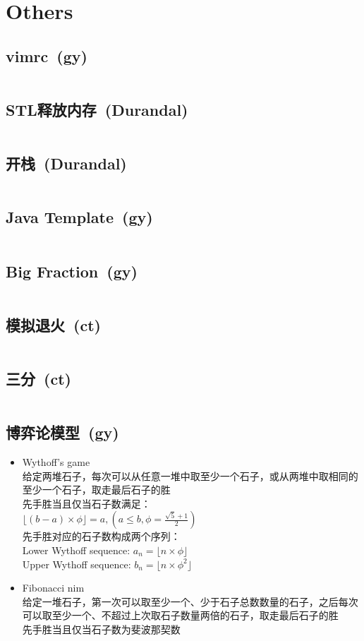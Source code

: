 \chapter{Others}
\section{vimrc\ \small(gy)}
	\inputminted{vim}{Others/.vimrc}
\section{STL释放内存\ \small(Durandal)}
	\inputminted{cpp}{Others/stl_clear.cpp}
\section{开栈\ \small(Durandal)}
	\inputminted{cpp}{Others/rsp.cpp}
\section{Java Template\ \small(gy)}
	\inputminted{java}{Others/Template.java}
\section{Big Fraction\ \small(gy)}
	\inputminted{kotlin}{Others/big_fraction.kt}
\section{模拟退火\ \small(ct)}
	\inputminted{cpp}{Others/simulated_annealing.cpp}
\section{三分\ \small(ct)}
	\inputminted{cpp}{Others/cubic_search.cpp}
\section{博弈论模型\ \small(gy)}
	\begin{itemize}
		\item Wythoff's game
			\\给定两堆石子，每次可以从任意一堆中取至少一个石子，或从两堆中取相同的至少一个石子，取走最后石子的胜
			\\先手胜当且仅当石子数满足：
			\\$\lfloor (b - a) \times \phi \rfloor=a, (a \leq b, \phi = \frac{\sqrt{5} + 1}{2})$
			\\先手胜对应的石子数构成两个序列：
			\\Lower Wythoff sequence: $a_n = \lfloor n \times \phi \rfloor$
			\\Upper Wythoff sequence: $b_n = \lfloor n \times \phi ^ 2 \rfloor$
		\item Fibonacci nim
			\\给定一堆石子，第一次可以取至少一个、少于石子总数数量的石子，之后每次可以取至少一个、不超过上次取石子数量两倍的石子，取走最后石子的胜
			\\先手胜当且仅当石子数为斐波那契数
	\end{itemize}
